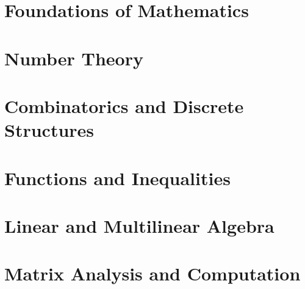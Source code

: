 
\part{Foundations of Mathematics}
\label{vol:01-foundations-of-mathematics}
\begingroup
\small
\sloppy
\parttoc
\endgroup



\part{Number Theory}
\label{vol:02-number-theory}
\begingroup
\small
\sloppy
\parttoc
\endgroup



\part{Combinatorics and Discrete Structures}
\label{vol:03-combinatorics-and-discrete-structures}
\begingroup
\small
\sloppy
\parttoc
\endgroup



\part{Functions and Inequalities}
\label{vol:04-functions-and-inequalities}
\begingroup
\small
\sloppy
\parttoc
\endgroup



\part{Linear and Multilinear Algebra}
\label{vol:05-linear-and-multilinear-algebra}
\begingroup
\small
\sloppy
\parttoc
\endgroup



\part{Matrix Analysis and Computation}
\label{vol:06-matrix-analysis-and-computation}
\begingroup
\small
\sloppy
\parttoc
\endgroup

